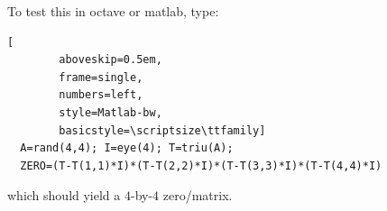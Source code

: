 \begin{example-non}
  To test this in octave or matlab, type:

  \begin{center}
    \begin{minipage}{\linewidth}
      \addtolength{\linewidth}{-7em}
      \begin{lstlisting}[
        aboveskip=0.5em,
        frame=single,
        numbers=left,
        style=Matlab-bw,
        basicstyle=\scriptsize\ttfamily]
  A=rand(4,4); I=eye(4); T=triu(A);
  ZERO=(T-T(1,1)*I)*(T-T(2,2)*I)*(T-T(3,3)*I)*(T-T(4,4)*I)
      \end{lstlisting}
      \addtolength{\linewidth}{+7em}
    \end{minipage}
  \end{center}

  which should yield a $4$-by-$4$ zero\-/matrix.
\end{example-non}

